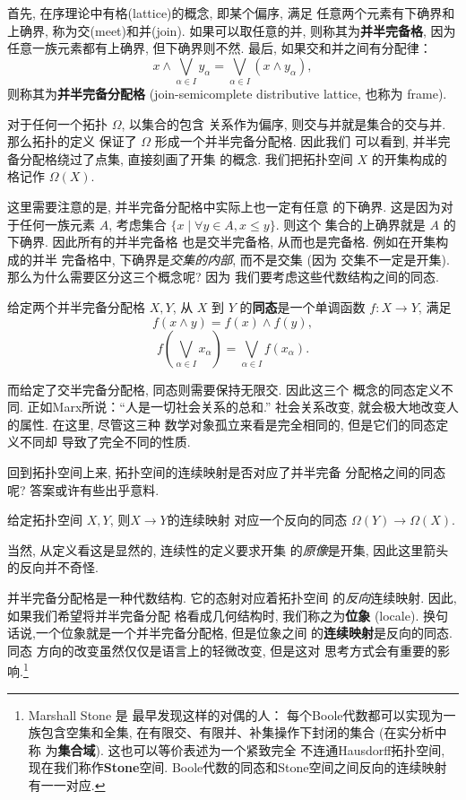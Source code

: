 首先, 在序理论中有格(lattice)的概念, 即某个偏序, 满足
任意两个元素有下确界和上确界, 称为交(meet)和并(join).
如果可以取任意的并, 则称其为\textbf{并半完备格},
因为任意一族元素都有上确界, 但下确界则不然.
最后, 如果交和并之间有分配律：
\[x \wedge \bigvee_{\alpha \in I} y_\alpha
= \bigvee_{\alpha \in I} (x \wedge y_\alpha),\]
则称其为\textbf{并半完备分配格} (join-semicomplete distributive lattice,
也称为 frame).

对于任何一个拓扑 \(\Omega\), 以集合的包含
关系作为偏序, 则交与并就是集合的交与并. 那么拓扑的定义
保证了 \(\Omega\) 形成一个并半完备分配格. 因此我们
可以看到, 并半完备分配格绕过了点集, 直接刻画了开集
的概念. 我们把拓扑空间 \(X\) 的开集构成的格记作 \(\Omega(X)\).

这里需要注意的是, 并半完备分配格中实际上也一定有任意
的下确界. 这是因为对于任何一族元素 \(A\), 考虑集合
\(\{x \mid \forall y \in A, x \le y\}\). 则这个
集合的上确界就是 \(A\) 的下确界. 因此所有的并半完备格
也是交半完备格, 从而也是完备格. 例如在开集构成的并半
完备格中, 下确界是\emph{交集的内部}, 而不是交集 (因为
交集不一定是开集). 那么为什么需要区分这三个概念呢? 因为
我们要考虑这些代数结构之间的同态.

\begin{definition}
给定两个并半完备分配格 \(X, Y\), 从 \(X\) 到 \(Y\)
的\textbf{同态}是一个单调函数 \(f : X \to Y\), 满足
\[f(x\wedge y) = f(x) \wedge f(y),\]
\[f\left(\bigvee_{\alpha \in I} x_\alpha\right)
= \bigvee_{\alpha \in I} f(x_\alpha).\]
\end{definition}

而给定了交半完备分配格, 同态则需要保持无限交. 因此这三个
概念的同态定义不同. 正如Marx所说：“人是一切社会关系的总和.”
社会关系改变, 就会极大地改变人的属性. 在这里, 尽管这三种
数学对象孤立来看是完全相同的, 但是它们的同态定义不同却
导致了完全不同的性质.

回到拓扑空间上来, 拓扑空间的连续映射是否对应了并半完备
分配格之间的同态呢? 答案或许有些出乎意料.
\begin{theorem}
给定拓扑空间 \(X, Y\), 则\(X \to Y\)的连续映射
对应一个反向的同态 \(\Omega(Y) \to \Omega(X)\).
\end{theorem}
当然, 从定义看这是显然的, 连续性的定义要求开集
的\emph{原像}是开集, 因此这里箭头的反向并不奇怪.

并半完备分配格是一种代数结构. 它的态射对应着拓扑空间
的\emph{反向}连续映射. 因此, 如果我们希望将并半完备分配
格看成几何结构时, 我们称之为\textbf{位象} (locale).
换句话说,一个位象就是一个并半完备分配格, 但是位象之间
的\textbf{连续映射}是反向的同态. 同态
方向的改变虽然仅仅是语言上的轻微改变, 但是这对
思考方式会有重要的影响.\footnote{Marshall Stone 是
最早发现这样的对偶的人： 每个Boole代数都可以实现为一族包含空集和全集,
在有限交、有限并、补集操作下封闭的集合 (在实分析中称
为\textbf{集合域}). 这也可以等价表述为一个紧致完全
不连通Hausdorff拓扑空间, 现在我们称作\textbf{Stone}空间.
Boole代数的同态和Stone空间之间反向的连续映射有一一对应.}

